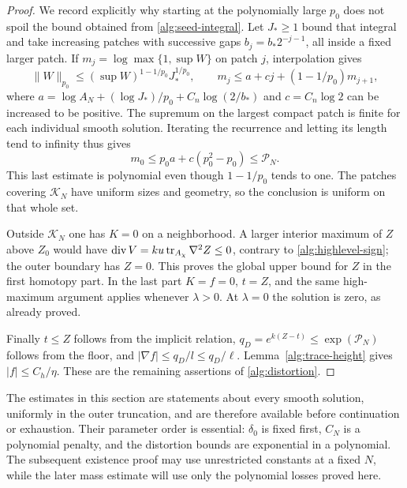 \begin{proof}
We record explicitly why starting at the polynomially large $p_0$
does not spoil the bound obtained from \eqref{alg:seed-integral}.
Let $J_*\geq1$ bound that integral and take increasing patches with
successive gaps $b_j=b_*2^{-j-1}$, all inside a fixed larger patch.
If $m_j=\log\max\{1,\sup W\}$ on patch $j$, interpolation gives
\[
 \|W\|_{p_0}\leq(\sup W)^{1-1/p_0}J_*^{1/p_0},\qquad
 m_j\leq a+cj+(1-1/p_0)m_{j+1},
\]
where
$a=\log A_N+(\log J_*)/p_0+C_n\log(2/b_*)$ and
$c=C_n\log2$ can be increased to be positive.  The supremum on the
largest compact patch is finite for each individual smooth solution.
Iterating the recurrence and letting its length tend to infinity thus
gives
\[
 m_0\leq p_0a+c(p_0^2-p_0)\leq\mathcal P_N.
\]
This last estimate is polynomial even though $1-1/p_0$ tends to one.
The patches covering $\mathcal K_N$ have uniform sizes and geometry,
so the conclusion is uniform on that whole set.

Outside $\mathcal K_N$ one has $K=0$ on a neighborhood.  A larger
interior maximum of $Z$ above $Z_0$ would have
$\operatorname{div} V=ku\operatorname{tr}_{A_\chi}\nabla^2Z\leq0$, contrary to
\eqref{alg:highlevel-sign}; the outer boundary has $Z=0$.
This proves the global upper bound for $Z$ in the first homotopy part.
In the last part $K=f=0$, $t=Z$, and the same high-maximum argument
applies whenever $\lambda>0$.  At $\lambda=0$ the solution is zero,
as already proved.

Finally $t\leq Z$ follows from the implicit relation,
$q_D=e^{k(Z-t)}\leq\exp(\mathcal P_N)$ follows from the floor,
and $|\nabla f|\leq q_D/l\leq q_D/\ell$.
Lemma~\ref{alg:trace-height} gives $|f|\leq C_h/\eta$.
These are the remaining assertions of \eqref{alg:distortion}.
\end{proof}

The estimates in this section are statements about every smooth solution,
uniformly in the outer truncation, and are therefore available before
continuation or exhaustion.  Their parameter order is essential:
$\delta_0$ is fixed first, $C_N$ is a polynomial penalty, and the
distortion bounds are exponential in a polynomial.  The subsequent
existence proof may use unrestricted constants at a fixed $N$, while
the later mass estimate will use only the polynomial losses proved here.
